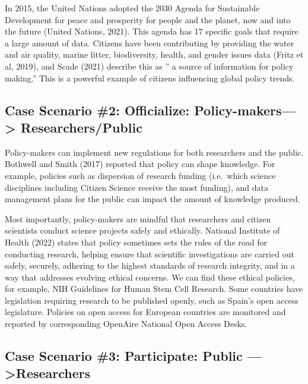 \documentclass[
  letterpaper,
  DIV=11,
  numbers=noendperiod]{scrreport}
\begin{document}
In 2015, the United Nations adopted the 2030 Agenda for Sustainable
Development for peace and prosperity for people and the planet, now and
into the future (United Nations, 2021). This agenda has 17 specific
goals that require a large amount of data. Citizens have been
contributing by providing the water and air quality, marine litter,
biodiversity, health, and gender issues data (Fritz et al, 2019), and
Scade (2021) describe this as '' a source of information for policy
making.'' This is a powerful example of citizens influencing global
policy trends.

\hypertarget{case-scenario-2-officialize-policy-makers-researcherspublic}{%
\subsection{Case Scenario \#2: Officialize:
Policy-makers---\textgreater{}
Researchers/Public}\label{case-scenario-2-officialize-policy-makers-researcherspublic}}

Policy-makers can implement new regulations for both researchers and the
public. Bothwell and Smith (2017) reported that policy can shape
knowledge. For example, policies such as dispersion of research funding
(i.e.~which science disciplines including Citizen Science receive the
most funding), and data management plans for the public can impact the
amount of knowledge produced.

Most importantly, policy-makers are mindful that researchers and citizen
scientists conduct science projects safely and ethically. National
Institute of Health (2022) states that policy sometimes sets the rules
of the road for conducting research, helping ensure that scientific
investigations are carried out safely, securely, adhering to the highest
standards of research integrity, and in a way that addresses evolving
ethical concerns. We can find these ethical policies, for example, NIH
Guidelines for Human Stem Cell Research. Some countries have legislation
requiring research to be published openly, such as Spain's open access
legislature. Policies on open access for European countries are
monitored and reported by corresponding OpenAire National Open Access
Desks.

\hypertarget{case-scenario-3-participate-public-researchers}{%
\subsection{Case Scenario \#3: Participate: Public
---\textgreater Researchers}\label{case-scenario-3-participate-public-researchers}}
\end{document}
